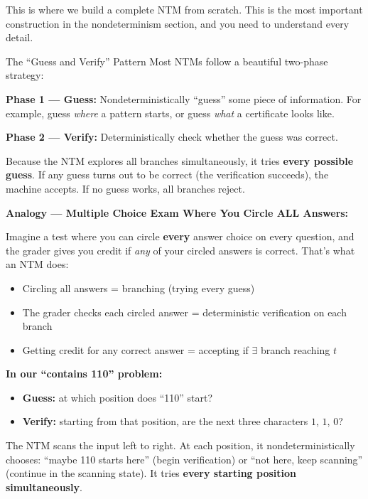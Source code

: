 This is where we build a complete NTM from scratch. This is the most important
construction in the nondeterminism section, and you need to understand every
detail.

\begin{notebox}{The ``Guess and Verify'' Pattern}
Most NTMs follow a beautiful two-phase strategy:

\textbf{Phase 1 --- Guess:} Nondeterministically ``guess'' some piece of
information. For example, guess \emph{where} a pattern starts, or guess
\emph{what} a certificate looks like.

\textbf{Phase 2 --- Verify:} Deterministically check whether the guess was
correct.

Because the NTM explores all branches simultaneously, it tries \textbf{every
possible guess}. If any guess turns out to be correct (the verification
succeeds), the machine accepts. If no guess works, all branches reject.

\textbf{Analogy --- Multiple Choice Exam Where You Circle ALL Answers:}

Imagine a test where you can circle \textbf{every} answer choice on every
question, and the grader gives you credit if \emph{any} of your circled answers
is correct. That's what an NTM does:
\begin{itemize}[nosep]
\item Circling all answers = branching (trying every guess)
\item The grader checks each circled answer = deterministic verification on
  each branch
\item Getting credit for any correct answer = accepting if $\exists$ branch
  reaching $t$
\end{itemize}

\textbf{In our ``contains 110'' problem:}
\begin{itemize}[nosep]
\item \textbf{Guess:} at which position does ``110'' start?
\item \textbf{Verify:} starting from that position, are the next three
  characters $1$, $1$, $0$?
\end{itemize}

The NTM scans the input left to right. At each position, it
nondeterministically chooses: ``maybe 110 starts here'' (begin verification) or
``not here, keep scanning'' (continue in the scanning state). It tries
\textbf{every starting position simultaneously}.
\end{notebox}

